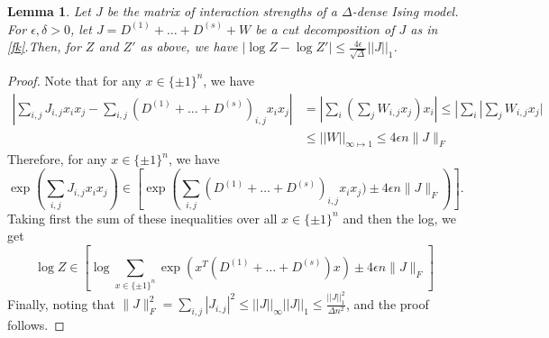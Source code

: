\documentclass[final, 12pt]{colt2018}
\newtheorem{lemma}[theorem]{Lemma}
\theoremstyle{definition}
\theoremstyle{plain}
\begin{document}
\begin{lemma}\label{applying-reg-lemma} Let $J$ be the matrix of interaction strengths of a $\Delta$-dense
Ising model. For $\epsilon,\delta>0$, let $J=D^{(1)}+\dots+D^{(s)}+W$
be a cut decomposition of $J$ as in \cref{fk}.Then, for $Z$ and $Z'$ as above, we have 
$|\log Z-\log Z'|\leq\frac{4\epsilon}{\sqrt{\Delta}}||J||_{1}$.

\end{lemma}
\begin{proof}
Note that for any $x\in\{\pm1\}^{n}$, we have 
\begin{align*}
|\sum_{i,j}J_{i,j}x_{i}x_{j}-\sum_{i,j}(D^{(1)}+\dots+D^{(s)})_{i,j}x_{i}x_{j}| & =|\sum_{i}(\sum_{j}W_{i,j}x_{j})x_{i}| \leq|\sum_{i}|\sum_{j}W_{i,j}x_{j}|\\
 & \leq||W||_{\infty\mapsto1} \leq4\epsilon n\|J\|_F
\end{align*}
Therefore, for any $x\in\{\pm1\}^{n}$, we have 
\[
\exp(\sum_{i,j}J_{i,j}x_{i}x_{j}) \in \left[ \exp\left(\sum_{i,j}(D^{(1)}+\dots+D^{(s)})_{i,j}x_{i}x_{j}) \pm 4\epsilon n\|J\|_F\right) \right].
\]
Taking first the sum of these inequalities over all $x\in\{\pm1\}^{n}$
and then the log, we get 
\[
\log Z \in \left[ \log\sum_{x\in\{\pm1\}^{n}}\exp \left(x^{T}(D^{(1)}+\dots+D^{(s)})x \right) \pm 4\epsilon n\|J\|_F \right]
\]
Finally, noting that $\|J\|_F^{2}=\sum_{i,j}|J_{i,j}|^{2}\leq||J||_{\infty}||J||_{1}\leq\frac{||J||_{1}^{2}}{\Delta n^{2}}$, and the proof follows.  
\end{proof}


\end{document}
